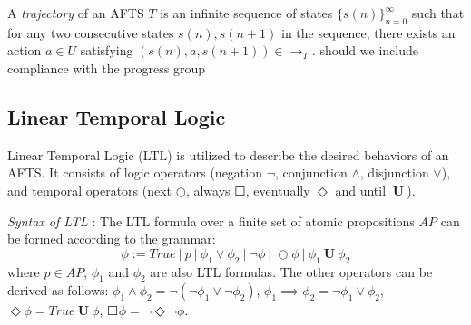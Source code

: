 A \emph{trajectory} of an AFTS $T$ is an infinite sequence of states $\{s(n)\}_{n=0}^{\infty}$ 
such that for any two consecutive states $s(n), s(n+1)$ in the sequence, there exists an action $a\in U$ satisfying $(s(n),a,s(n+1))\in \rightarrow_T$. {\color{red}should we include compliance with the progress group}

\subsection{Linear Temporal Logic}

Linear Temporal Logic (LTL) is utilized to describe the desired behaviors of an AFTS. It consists of logic operators (negation $ \neg $, conjunction $ \wedge $, disjunction $ \vee $), and temporal operators (next $ \bigcirc $, always $ \Square $, eventually $ \Diamond $ and until $ \mathbf{\ U\ }$).


{\color{black}\emph{ Syntax of LTL} \cite{baier2008principles}: The LTL formula over a finite set of atomic propositions $ AP $ can be formed according to the grammar:}
\begin{displaymath}
\phi := True\ \vert\ p\ \vert\ \phi_1 \vee \phi_2\ \vert\ \neg \phi\ \vert\ \bigcirc \phi\ \vert\ \phi_1 \mathbf{\ U\ }\phi_2
\end{displaymath}
where $ p\in AP $, $ \phi_1 $ and $ \phi_2 $ are also LTL formulas. The other operators can be derived as follows: $ \phi_1 \wedge \phi_2 = \neg (\neg \phi_1 \vee \neg \phi_2) $, $ \phi_1 \implies \phi_2 = \neg \phi_1 \vee \phi_2 $, $ \Diamond \phi = True \mathbf{\ U\ } \phi $, $ \Square \phi = \neg \Diamond \neg \phi $.

